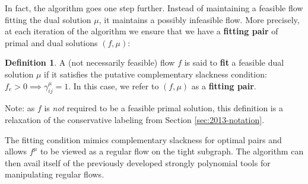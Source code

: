 \documentclass[11pt]{article}
\theoremstyle{definition}
\newtheorem{definition}{Definition}[section]
\theoremstyle{definition}
\newcommand{\giij}{\gamma_{ij}^{\mu}}
\begin{document}
	In fact, the algorithm goes one step further. Instead of maintaining a feasible flow
	fitting the dual solution $\mu$, it maintains a possibly infeasible flow. More precisely,
    at each iteration of the algorithm we ensure that we have a \textbf{fitting pair}
	of primal and dual solutions $(f,\mu)$:
	\begin{definition}
	A (not necessarily feasible) flow $f$ is said to \textbf{fit} a feasible dual solution $\mu$
    if it satisfies the putative complementary slackness condition: $f_e > 0 \implies \giij = 1$.
    In this case, we refer to $(f, \mu)$ as a \textbf{fitting pair}.
	\end{definition}
    Note: as $f$ is \emph{not} required to be a feasible primal solution,
    this definition is a relaxation of the
	conservative labeling from Section \ref{sec:2013-notation}.
	
	The fitting condition mimics complementary
	slackness for optimal pairs and allows $f^\mu$ to be viewed as a regular flow
	on the tight subgraph. The algorithm can then avail itself of the previously developed
	strongly polynomial tools for manipulating regular flows.
    
\end{document}
